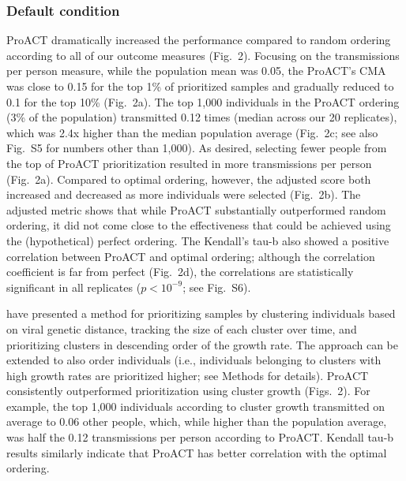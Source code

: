 \documentclass[a4paper,11pt]{article}
\newcommand{\authorcite}[1]{\citeauthor{#1}\supercite{#1}}
\newcommand{\TODO}[1]{{\color{red} #1} }
\newcommand{\PLWH}{sample\xspace}
\begin{document}
\subsubsection{Default condition}
ProACT dramatically increased the performance compared to random ordering according to all of our outcome measures (Fig.~2).
Focusing on the transmissions per person measure, while the population mean was 0.05, the ProACT's CMA was close to 0.15 for the top 1\% of prioritized \PLWH{s} and gradually reduced to 0.1 for the top 10\% (Fig.~2a).
The top 1,000 individuals in the ProACT ordering (3\% of the population)  transmitted {0.12} times (median across our 20 replicates), which was 2.4x  higher than the median population average (Fig.~2c; see also Fig.~S5 for numbers other than 1,000).
As desired, selecting fewer people from the top of ProACT prioritization resulted in more transmissions per person (Fig.~2a).
Compared to optimal ordering, however, the adjusted score both increased and decreased as more individuals were selected (Fig.~2b). 
The adjusted metric shows that while ProACT substantially outperformed random ordering, it did not come close to the effectiveness that could be achieved using the (hypothetical) perfect ordering. 
The Kendall's tau-b also showed a positive correlation between ProACT and optimal ordering;  although the correlation coefficient is far from perfect (Fig.~2d), the correlations are statistically significant in all replicates ($p<10^{-9}$; see Fig.~S6).




\authorcite{Wertheim2018} have presented a method for prioritizing \PLWH{s} by clustering individuals based on viral genetic distance, tracking the size of each cluster over time, and prioritizing clusters in descending order of the growth rate. The approach can be extended to also order individuals (i.e., individuals belonging to clusters with high growth rates are prioritized higher; see Methods for details).
ProACT consistently outperformed prioritization using cluster growth  (Figs.~2).
For example, the top 1,000 individuals according to cluster growth transmitted on average to 0.06 other people, which, while higher than the population average, was half the 0.12 transmissions per person according to ProACT. 
Kendall tau-b results similarly indicate that ProACT has better correlation with the optimal ordering.
\end{document}
